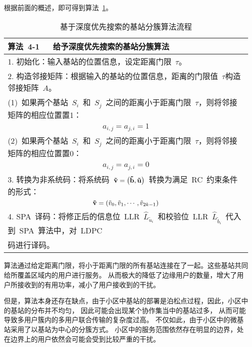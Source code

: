 根据前面的概述，即可得到算法~\ref{algorithm_bs_dfs}。
\begin{table}[H]
\caption{基于深度优先搜索的基站分簇算法流程}
\label{algorithm_bs_dfs}
\vspace{0.5em}\wuhao
\begin{tabularx}{1.0\textwidth}{l}
\toprule[1.5pt]
算法~4-1~~~给予深度优先搜索的基站分簇算法 \\
\midrule[0.5pt]
1. 初始化：输入基站的位置信息，设定距离门限~$\tau$。 \\
2. 构造邻接矩阵：根据输入的基站的位置信息，距离的门限值~$\tau$构造邻接矩阵~$A$。\\
\qquad (1)~如果两个基站~$S_i$~和~$S_j$~之间的距离小于距离门限~$\tau$，则将邻接矩阵的相应位置置1：\\
\multicolumn{1}{c}{$a_{i,j}=a_{j,i}=1$}\\

 \qquad(2)~如果两个基站~$S_i$~和~$S_j$~之间的距离小于距离门限~$\tau$，则将邻接矩阵的相应位置置0：\\
\multicolumn{1}{c}{$a_{i,j}=a_{j,i}=0$}\\

3. 转换为非系统码：将系统码~${\bf{\tilde v}} = \left( {{\bf{\tilde b}},{\bf{\tilde u}}} \right)$~转换为满足~RC~约束条件的形式：\\
\multicolumn{1}{c}{${\bf{\tilde v}} = \left( {{{\tilde v}_0},{{\tilde v}_1}, \cdots ,{{\tilde v}_{2k - 1}}} \right)$} \\
4. SPA~译码：将修正后的信息位~LLR~${\hat L_{{{\tilde u}_i}}}$~和校验位~LLR~${\hat L_{{{\tilde b}_i}}}$~代入到~SPA~算法中，对~LDPC\\码进行译码。\\
\bottomrule[1.5pt]
\end{tabularx}
\end{table}

算法通过给定距离门限，将小于距离门限的所有基站连接在了一起。这些基站共同给所覆盖区域内的用户进行服务。
从而极大的降低了边缘用户的数量，增大了用户所接收到的有用功率，减小了用户接收到的干扰。

但是，算法本身还存在缺点，由于小区中基站的部署是泊松点过程，因此，小区中的基站的分布并不均匀，
因此可能会出现某个协作集当中的基站过多，
从而可能导致多用户簇内的多用户联合传输的复杂度过高。
不仅如此，由于小区中的微基站采用了以基站为中心的分簇方式。
小区中的服务范围依然存在明显的边界，处在边界上的用户依然会可能会受到比较严重的干扰。





